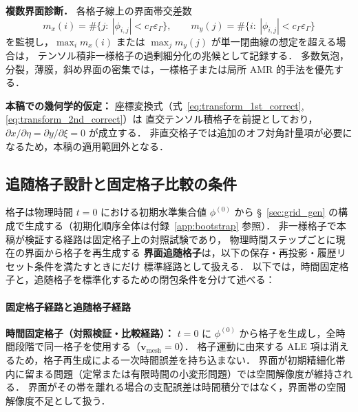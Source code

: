 \noindent\textbf{複数界面診断．}
各格子線上の界面帯交差数
\[
  m_x(i)=\#\{j:\ |\phi_{i,j}|<c_\Gamma\varepsilon_\Gamma\},\qquad
  m_y(j)=\#\{i:\ |\phi_{i,j}|<c_\Gamma\varepsilon_\Gamma\}
\]
を監視し，$\max_i m_x(i)$ または $\max_j m_y(j)$ が単一閉曲線の想定を超える場合は，
テンソル積非一様格子の過剰細分化の兆候として記録する．
多数気泡，分裂，薄膜，斜め界面の密集では，一様格子または局所 AMR 的手法を優先する．

\textbf{本稿での幾何学的仮定：} 座標変換式（式~\eqref{eq:transform_1st_correct}, \eqref{eq:transform_2nd_correct}）は
直交テンソル積格子を前提としており，$\partial x/\partial\eta = \partial y/\partial\xi = 0$ が成立する．
非直交格子では追加のオフ対角計量項が必要になるため，本稿の適用範囲外となる．

\subsection{追随格子設計と固定格子比較の条件}
\label{sec:grid_ale}

格子は物理時間 $t=0$ における初期水準集合値 $\phi^{(0)}$ から
§~\ref{sec:grid_gen} の構成で生成する（初期化順序全体は付録~\ref{app:bootstrap} 参照）．
非一様格子で本稿が検証する経路は固定格子上の対照試験であり，
物理時間ステップごとに現在の界面から格子を再生成する
\textbf{界面追随格子}は，以下の保存・再投影・履歴リセット条件を満たすときにだけ
標準経路として扱える．
以下では，時間固定格子と，追随格子を標準化するための閉包条件を分けて述べる：

\paragraph{固定格子経路と追随格子経路}
\label{box:grid_modes}
\textbf{時間固定格子（対照検証・比較経路）：}
$t=0$ に $\phi^{(0)}$ から格子を生成し，全時間段階で同一格子を使用する（$\bm{v}_\text{mesh}=0$）．
格子運動に由来する ALE 項は消えるため，格子再生成による一次時間誤差を持ち込まない．
界面が初期精細化帯内に留まる問題（定常または有限時間の小変形問題）では空間解像度が維持される．
界面がその帯を離れる場合の支配誤差は時間積分ではなく，界面帯の空間解像度不足として扱う．

